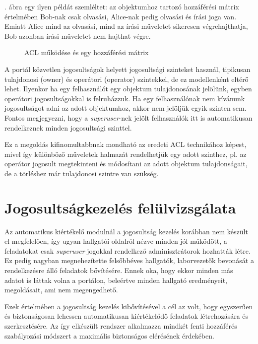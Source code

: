 . ábra egy ilyen példát szemléltet: az objektumhoz tartozó hozzáférési mátrix értelmében Bob-nak csak olvasási, Alice-nak pedig olvasási és írási joga van. Emiatt Alice mind az olvasási, mind az írási műveletet sikeresen végrehajthatja, Bob azonban írási műveletet nem hajthat végre.

\begin{figure}[h]
    \centering
    \caption{ACL működése és egy hozzáférési mátrix}
    \label{fig:acl}
\end{figure}

A portál közvetlen jogosultságok helyett jogosultsági szinteket használ, tipikusan tulajdonosi (owner) és operátori (operator) szintekkel, de ez modellenként eltérő lehet. Ilyenkor ha egy felhasználót egy objektum tulajdonosának jelölünk, egyben operátori jogosultságokkal is felruházzuk. Ha egy felhasználónak nem kívánunk jogosultságot adni az adott objektumhoz, akkor nem jelöljük egyik szinten sem. Fontos megjegyezni, hogy a \textit{superuser}-nek jelölt felhasználók itt is automatikusan rendelkeznek minden jogosultsági szinttel.

Ez a megoldás kifinomultabbnak mondható az eredeti ACL technikához képest, mivel így különböző műveletek halmazát rendelhetjük egy adott szinthez, pl. az operátor jogosult megtekinteni és módosítani az adott objektum tulajdonságait, de a törléshez már tulajdonosi szintre van szükség.

\section{Jogosultságkezelés felülvizsgálata}

Az automatikus kiértékelő modulnál a jogosultság kezelés korábban nem készült el megfelelően, így ugyan hallgatói oldalról nézve minden jól működött, a feladatokat csak \textit{superuser} jogokkal rendelkező adminisztrátorok hozhatták létre. Ez pedig nagyban megnehezítette felsőbbéves hallgatók, laborvezetők bevonását a rendelkezésre álló feladatok bővítésére. Ennek oka, hogy ekkor minden más adatot is láttak volna a portálon, beleértve minden hallgató eredményeit, megoldásait, ami nem megengedhető.

Ezek értelmében a jogosultság kezelés kibővítésével a cél az volt, hogy egyszerűen és biztonságosan lehessen automatikusan kiértékelődő feladatok létrehozására és szerkesztésére. Az így elkészült rendszer alkalmazza mindkét fenti hozzáférés szabályozási módszert a maximális biztonságos elérésének érdekében.

